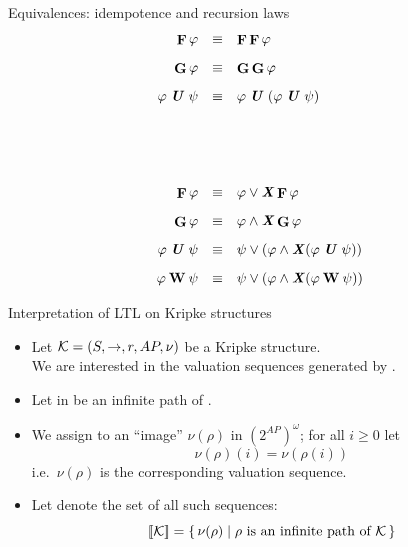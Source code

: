 \begin{frame}{Equivalences: idempotence and recursion laws}
$$\begin{array}{rcl}
\F \phi & \equiv & \F \F \phi    \\[0.3cm]
\G \phi & \equiv & \G \G \phi    \\[0.3cm]
\phi \hl{\U} \psi & \equiv & \phi \hl{\U} (\phi \hl{\U} \psi) \\[2cm]

\F \phi & \equiv & \phi \vee \hl{\X} \F \phi \\[0.3cm]
\G \phi & \equiv & \phi \wedge \hl{\X} \G \phi \\[0.3cm]
\phi \hl{\U} \psi & \equiv & \psi \vee (\phi \wedge \hl{\X} (\phi \hl{\U} \psi)) \\[0.3cm]
\phi \W \psi & \equiv & \psi \vee (\phi \wedge \hl{\X} (\phi \W \psi))
\end{array}$$
\end{frame}


\begin{frame}{Interpretation of LTL on Kripke structures}
\begin{itemize}
\itemsep1em  
\item Let ${\cal K}=(S,\mathord{\to},r,AP,\nu)$ be a Kripke structure.\\
 We are interested in the valuation sequences generated by .

\item Let \m{\rho} in  be an infinite path of .

\item We assign to \m{\rho} an ``image'' $\nu(\rho)$
   in $(2^{AP})^\omega$; for all $i\ge0$ let
  $$\nu(\rho)(i) = \nu(\rho(i))$$
   i.e.\ $\nu(\rho)$ is the corresponding valuation sequence.

\item Let  denote the set of all such sequences:
$$\lbrack\!\lbrack{\cal K}\rbrack\!\rbrack = \{\,\nu(\rho)\mid \hbox{$\rho$ is
    an infinite path of $\cal K$}\,\}$$
\end{itemize}
\end{frame}


